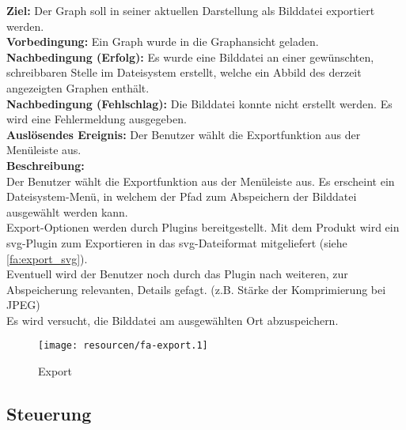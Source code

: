 \label{fa:export_img}
\textbf{Ziel:} Der Graph soll in seiner aktuellen Darstellung als Bilddatei exportiert werden.\\
\textbf{Vorbedingung:} Ein Graph wurde in die Graphansicht geladen. \\
\textbf{Nachbedingung (Erfolg):} Es wurde eine Bilddatei an einer gewünschten, schreibbaren Stelle im Dateisystem erstellt, welche ein Abbild des derzeit angezeigten Graphen enthält.\\
\textbf{Nachbedingung (Fehlschlag):} Die Bilddatei konnte nicht erstellt werden. Es wird eine Fehlermeldung ausgegeben.\\
\textbf{Auslösendes Ereignis:}
Der Benutzer wählt die Exportfunktion aus der Menüleiste aus.\\
\textbf{Beschreibung:}\\
Der Benutzer wählt die Exportfunktion aus der Menüleiste aus.
Es erscheint ein Dateisystem-Menü, in welchem der Pfad zum Abspeichern der Bilddatei ausgewählt werden kann.\\
Export-Optionen werden durch Plugins bereitgestellt.
Mit dem Produkt wird ein \gls{svg}-Plugin zum Exportieren in das \gls{svg}-Dateiformat mitgeliefert (siehe \ref{fa:export_svg}).\\
Eventuell wird der Benutzer noch durch das Plugin nach weiteren, zur Abspeicherung relevanten, Details gefagt. (z.B. Stärke der Komprimierung bei JPEG)\\ %
Es wird versucht, die Bilddatei am ausgewählten Ort abzuspeichern.
\begin{figure}[ht]
  \centering
  \texttt{[image: resourcen/fa-export.1]}
  \caption{Export}
  \label{fig:export}
\end{figure}

\subsection{Steuerung}
\setcounter{fanr}{200}

